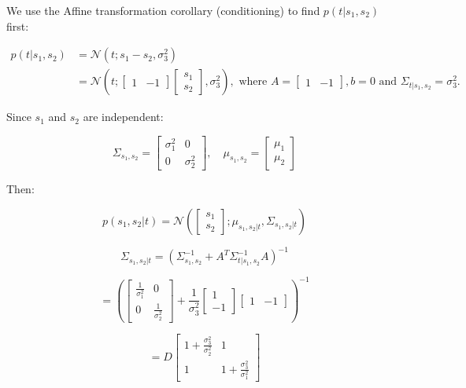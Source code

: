 We use the Affine transformation corollary (conditioning) to find $p(t|s_1, s_2)$ first:

\begin{align*}
    p(t|s_1, s_2) &= \mathcal{N}\left(t; s_1 - s_2, \sigma_3^2\right) \\
    &= \mathcal{N}\left(t; \begin{bmatrix} 1 & -1 \end{bmatrix} \begin{bmatrix} s_1 \\ s_2 \end{bmatrix}, \sigma_3^2\right), \text{ where } A = \begin{bmatrix} 1 & -1 \end{bmatrix}, b = 0 \text{ and } \Sigma_{t|s_1, s_2} = \sigma_3^2.
\end{align*}

Since $s_1$ and $s_2$ are independent:

\[
\Sigma_{s_1, s_2} = \begin{bmatrix} \sigma_1^2 & 0 \\ 0 & \sigma_2^2 \end{bmatrix}, \quad \mu_{s_1, s_2} = \begin{bmatrix} \mu_1 \\ \mu_2 \end{bmatrix}
\]

Then:

\[
p(s_1, s_2|t) = \mathcal{N}\left( \begin{bmatrix} s_1 \\ s_2 \end{bmatrix}; \mu_{s_1, s_2|t}, \Sigma_{s_1, s_2|t} \right)
\]

\[
\Sigma_{s_1, s_2|t} = \left( \Sigma_{s_1, s_2}^{-1} + A^T \Sigma_{t|s_1, s_2}^{-1} A \right)^{-1}
\]

\[
= \left( \begin{bmatrix} \frac{1}{\sigma_1^2} & 0 \\ 0 & \frac{1}{\sigma_2^2} \end{bmatrix} + \frac{1}{\sigma_3^2} \begin{bmatrix} 1 \\ -1 \end{bmatrix} \begin{bmatrix} 1 & -1 \end{bmatrix} \right)^{-1}
\]

\[
= D \begin{bmatrix} 1 + \frac{\sigma_3^2}{\sigma_2^2} & 1 \\ 1 & 1 + \frac{\sigma_3^2}{\sigma_1^2} \end{bmatrix}
\]

